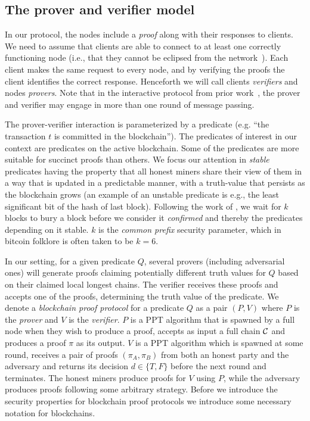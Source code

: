 \subsection{The prover and verifier model}
In our protocol, the nodes include a \emph{proof} along with their responses to
clients. We need to assume that clients are able to connect to at least one
correctly functioning node (i.e., that they cannot be eclipsed from the
network~\cite{heilman2015eclipse,hijackingbitcoin}). Each client makes the same
request to every node, and by verifying the proofs the client identifies the
correct response. Henceforth we will call clients \textit{verifiers} and nodes
\textit{provers}. Note that in the interactive protocol from prior
work~\cite{KLS},  the prover and verifier may engage in more than one round of
message passing.

The prover-verifier interaction is parameterized by a predicate (e.g. ``the
transaction $t$ is committed in the blockchain'').
%
The predicates of interest in our context are predicates on the active
blockchain. Some of the predicates are more suitable for succinct proofs than
others. We focus our attention in \textit{stable} predicates having the property
that all honest miners share their view of them in a way that is updated in a
predictable manner, with a truth-value that persists as the blockchain grows (an
example of an unstable predicate is e.g., the least significant bit of the hash
of last block). Following the work of \cite{backbone}, we wait for $k$ blocks to
bury a block before we consider it \textit{confirmed} and thereby the predicates
depending on it stable. $k$ is the \textit{common prefix} security parameter,
which in bitcoin folklore is often taken to be $k = 6$.

In our setting, for a given predicate $Q$, several  provers (including
adversarial ones) will generate proofs claiming potentially different truth
values for $Q$ based on their claimed local longest chains. The verifier
receives these proofs and accepts one of the proofs, determining the truth value
of the predicate.  We denote a  \textit{blockchain proof protocol} for a
predicate $Q$ as a pair $(P, V)$ where $P$ is the \textit{prover} and $V$ is the
\textit{verifier}. $P$ is a PPT algorithm that is spawned by a full node when
they wish to produce a proof, accepts as input a full chain $\mathcal{C}$ and
produces a proof $\pi$ as its output. $V$ is a PPT algorithm which is spawned at
some round, receives a pair of proofs $(\pi_A, \pi_B)$ from both an honest party
and the adversary and returns its decision $d \in \{T, F\}$ before the
next round and terminates. The honest miners produce proofs for $V$ using $P$,
while the adversary produces proofs following some arbitrary strategy. Before we
introduce the security properties for blockchain proof protocols we introduce
some necessary notation for blockchains.

